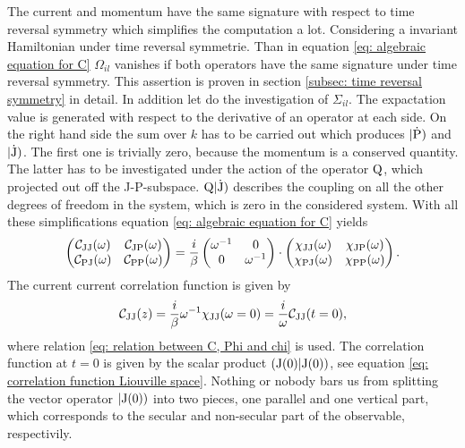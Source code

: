 The current and momentum have the same signature with respect to time reversal symmetry which simplifies the computation a lot.
Considering a invariant Hamiltonian under time reversal symmetrie.
Than in equation \eqref{eq: algebraic equation for C} $\Omega_{il}$ vanishes if both operators have the same signature under time reversal symmetry.
This assertion is proven in section \ref{subsec: time reversal symmetry} in detail.
In addition let do the investigation of $\Sigma_{il}$.
The expactation value is generated with respect to the derivative of an operator at each side.
On the right hand side the sum over $k$ has to be carried out which produces $|\mathrm{\dot{\mathrm{P}}})$ and $|\mathrm{\dot{\mathrm{J}}})$.
The first one is trivially zero, because the momentum is a conserved quantity.
The latter has to be investigated under the action of the operator $\mathrm{Q}$, which projected out off the J-P-subspace.
$\mathrm{Q}|\mathrm{\dot{\mathrm{J}}})$ describes the coupling on all the other degrees of freedom in the system, which is zero in the considered system.
With all these simplifications equation \eqref{eq: algebraic equation for C} yields
%
\begin{align}
	\begin{pmatrix}
	\mathcal{C}_{\mathrm{JJ}}(\omega) &  \mathcal{C}_{\mathrm{JP}}(\omega) \\
	\mathcal{C}_{\mathrm{PJ}}(\omega) &  \mathcal{C}_{\mathrm{PP}}(\omega)
	\end{pmatrix}
	=
	\frac{i}{\beta}
	\begin{pmatrix}
	\omega^{-1} & 0 \\
	0 & \omega^{-1} 
	\end{pmatrix}
	\cdot
	\begin{pmatrix}
	\chi_{\mathrm{JJ}}(\omega) &  \chi_{\mathrm{JP}}(\omega) \\
	\chi_{\mathrm{PJ}}(\omega) &  \chi_{\mathrm{PP}}(\omega)
	\end{pmatrix}.
\end{align}
%
The current current correlation function is given by
%
\begin{align}
	\mathcal{C}_{\mathrm{JJ}}(z) = \frac{i}{\beta} \omega^{-1} \chi_{\mathrm{JJ}}(\omega=0) = \frac{i}{\omega} \mathcal{C}_{\mathrm{JJ}}(t=0),
	\label{eq: correlation function unpertubated system}
\end{align}
%
where relation \eqref{eq: relation between C, Phi and chi} is used.
The correlation function at $t = 0$ is given by the scalar product $({\mathrm{J}(0)}|{\mathrm{J}(0)})$, see equation \eqref{eq: correlation function Liouville space}.
Nothing or nobody bars us from splitting the vector operator $|\mathrm{\mathrm{J}(0)})$ into two pieces, one parallel and one vertical part, which corresponds to the secular and non-secular part of the observable, respectivily.
